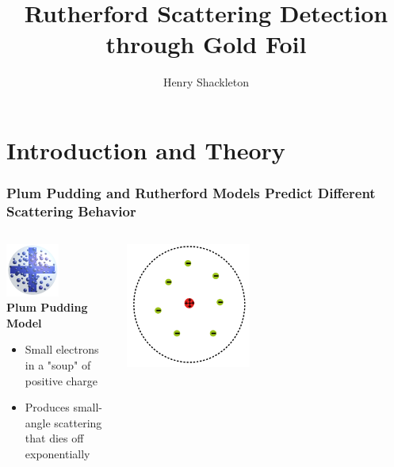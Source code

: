 \documentclass{beamer}
\title[Rutherford Scattering]{Rutherford Scattering Detection through Gold Foil}
\author{Henry Shackleton}
\begin{document}
\titlepage

\section{Introduction and Theory}

\begin{frame}
  \frametitle{Plum Pudding and Rutherford Models Predict Different Scattering Behavior}
  \begin{columns}
    \begin{column}{0.5\textwidth}
      \begin{center}
      \includegraphics[width=0.5\textwidth]{plum}
      \\
      \textbf{Plum Pudding Model}
      \begin{itemize}
        \pause
        \item Small electrons in a "soup" of positive charge
          \pause
        \item Produces small-angle scattering that dies off exponentially
          \pause
      \end{itemize}
    \end{center}
    \end{column}
    \begin{column}{0.5\textwidth}
      \begin{center}
      \item
        \vspace{-20pt}
      \includegraphics[width=0.44\textwidth]{rutherford.png}

\end{center}
\end{column}
\end{columns}
\end{frame}
\end{document}
